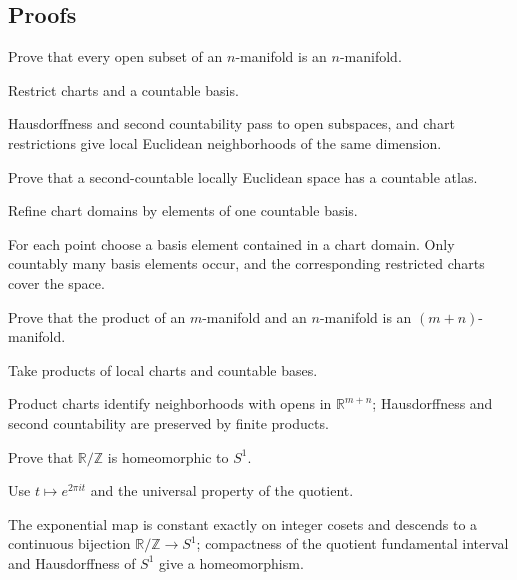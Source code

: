 \subsection*{Proofs}

\begin{exercise}\label{exr:vii01-ped-06}
Prove that every open subset of an \(n\)-manifold is an \(n\)-manifold.
\end{exercise}
\begin{hint}
Restrict charts and a countable basis.
\end{hint}
\begin{solution}
Hausdorffness and second countability pass to open subspaces, and chart restrictions give local Euclidean neighborhoods of the same dimension.
\end{solution}

\begin{exercise}\label{exr:vii01-ped-07}
Prove that a second-countable locally Euclidean space has a countable atlas.
\end{exercise}
\begin{hint}
Refine chart domains by elements of one countable basis.
\end{hint}
\begin{solution}
For each point choose a basis element contained in a chart domain.  Only countably many basis elements occur, and the corresponding restricted charts cover the space.
\end{solution}

\begin{exercise}\label{exr:vii01-ped-08}
Prove that the product of an \(m\)-manifold and an \(n\)-manifold is an \((m+n)\)-manifold.
\end{exercise}
\begin{hint}
Take products of local charts and countable bases.
\end{hint}
\begin{solution}
Product charts identify neighborhoods with opens in \(\mathbb R^{m+n}\); Hausdorffness and second countability are preserved by finite products.
\end{solution}

\begin{exercise}\label{exr:vii01-ped-09}
Prove that \(\mathbb R/\mathbb Z\) is homeomorphic to \(S^1\).
\end{exercise}
\begin{hint}
Use \(t\mapsto e^{2\pi i t}\) and the universal property of the quotient.
\end{hint}
\begin{solution}
The exponential map is constant exactly on integer cosets and descends to a continuous bijection \(\mathbb R/\mathbb Z\to S^1\); compactness of the quotient fundamental interval and Hausdorffness of \(S^1\) give a homeomorphism.
\end{solution}

